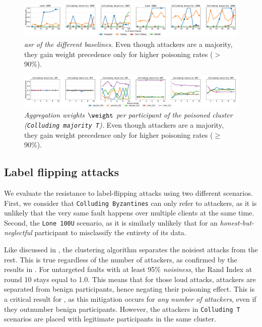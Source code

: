 \begin{figure} %
  \centering 
  \includegraphics[width=\linewidth]{figures/poisoning/asr_multiple_baselines.pdf}    
  \caption{
    \emph{\Acrfull{asr} of the different baselines.}
    Even though attackers are a majority, they gain weight precedence only for higher poisoning rates ($>$90\%).  
  }
  \label{fig:asr_multiple_baselines}
\end{figure}

\begin{figure} %
  \centering     
    \includegraphics[width=\linewidth]{figures/reput/majority_attackers_targeted_multiple_percents.pdf}    
  \caption{
    \emph{Aggregation weights $\weight$ per participant of the poisoned cluster (\texttt{Colluding majority T}).}
    Even though attackers are a majority, they gain weight precedence only for higher poisoning rates ($\ge$90\%).  
  }
  \label{fig:majority_targeted_flipping_effect}
\end{figure}


\subsection{Label flipping attacks\label{sec:radar.results.flipping}}

We evaluate the resistance to label-flipping attacks using two different scenarios.
First, we consider that \texttt{Colluding Byzantines} can only refer to attackers, as it is unlikely that the very same fault happens over multiple clients at the same time.
Second, the \texttt{Lone~100U} scenario, as it is similarly unlikely that for an \emph{honest-but-neglectful} participant to misclassify the entirety of its data.

Like discussed in , the clustering algorithm separates the noisiest attacks from the rest.
This is true regardless of the number of attackers, as confirmed by the results in .
For untargeted faults with at least 95\% \emph{noisiness}, the Rand Index at round 10 stays equal to 1.0.
This means that for those loud attacks, attackers are separated from benign participants, hence negating their poisoning effect.
This is a critical result for \thecontrib, as this mitigation occurs for \emph{any number of attackers}, even if they outnumber benign participants.
However, the attackers in \texttt{Colluding T} scenarios are placed with legitimate participants in the same cluster. 


